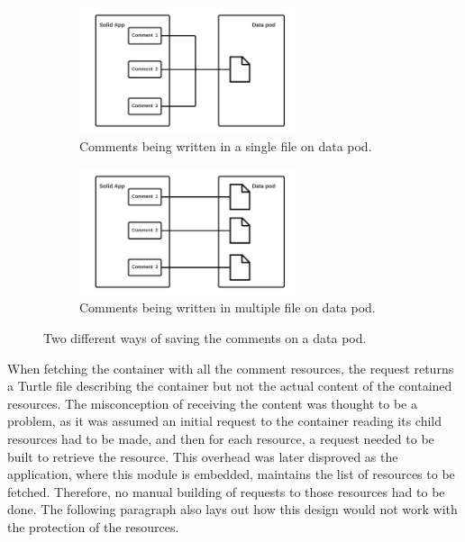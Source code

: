 \begin{figure}
    \centering
    \begin{subfigure}{.5\textwidth}
      \centering
      \includegraphics[width=0.7\textwidth]{prototype/graphs/poc-comment-single-resource-comments.png}
      \caption{Comments being written in a single file on data pod.}
      \label{fig:ppc-comment-single-resource-comments}
    \end{subfigure}%
    \begin{subfigure}{.5\textwidth}
      \centering
      \includegraphics[width=0.7\textwidth]{prototype/graphs/poc-comment-multiple-resources-comments.png}
      \caption{Comments being written in multiple file on data pod.}
      \label{fig:poc-comment-multiple-resources-comments}
    \end{subfigure}
    \caption{Two different ways of saving the comments on a data pod.}
    \label{fig:save-resource}
\end{figure}

When fetching the container with all the comment resources, the request returns a Turtle file describing the container but not the actual content of the contained resources. The misconception of receiving the content was thought to be a problem, as it was assumed an initial request to the container reading its child resources had to be made, and then for each resource, a request needed to be built to retrieve the resource. This overhead was later disproved as the application, where this module is embedded, maintains the list of resources to be fetched. Therefore, no manual building of requests to those resources had to be done. The following paragraph also lays out how this design would not work with the protection of the resources.

